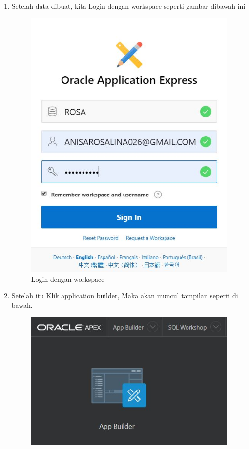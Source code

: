 \begin{enumerate}
    \item Setelah data dibuat, kita Login dengan workspace seperti gambar dibawah ini
    \begin{figure}[!htbp]
    \begin{center}
    \includegraphics[scale=0.9]{section/ica27.JPG}
    \caption{Login dengan workspace}
    \end{center}   
    \end{figure} \vspace{12cm}
\item Setelah itu Klik application builder, Maka akan muncul tampilan seperti di bawah.
    \begin{figure}[!htbp]
    \begin{center}
    \includegraphics[scale=0.9]{section/ica29.JPG}

\end{center}
\end{figure}
\end{enumerate}
